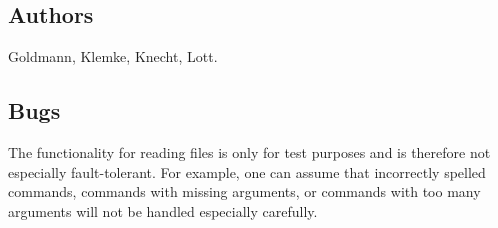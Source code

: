 \subsection*{Authors}
Goldmann, Klemke, Knecht, Lott.

\subsection*{Bugs}
The functionality for reading files is only for test purposes and is
therefore not especially fault-tolerant.  For example, one can assume
that incorrectly spelled commands, commands with missing arguments, or
commands with too many arguments will not be handled especially
carefully. 

